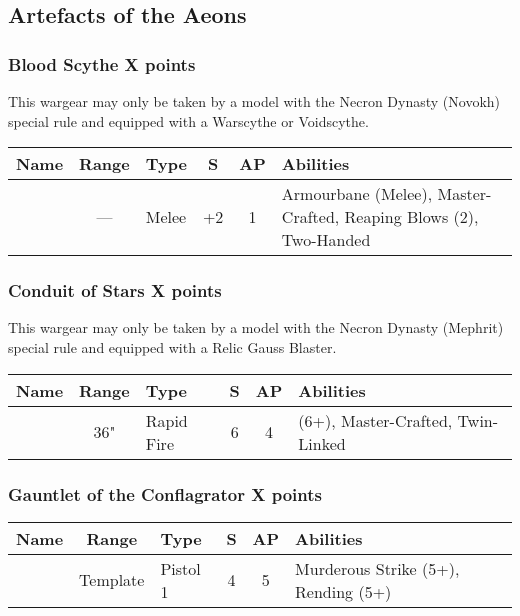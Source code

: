 \newpage
\subsection{Artefacts of the Aeons} \label{Artefacts of the Aeons}

\subsubsection[Blood Scythe]{Blood Scythe \dotfill X points}

This wargear may only be taken by a model with the Necron Dynasty (Novokh) special rule and equipped with a Warscythe or Voidscythe.

\label{Blood Scythe}
\noindent
\begin{NiceTabular}{L{115 pt} c C{40pt} *{2}{c} >{\raggedright\arraybackslash}p{240pt}}
	Name & Range & Type & S & AP & Abilities \\
	\hline
	 & — & Melee & +2 & 1 & Armourbane (Melee), Master-Crafted, Reaping Blows (2), Two-Handed \\
\end{NiceTabular}

\subsubsection[Conduit of Stars]{Conduit of Stars \dotfill X points}
This wargear may only be taken by a model with the Necron Dynasty (Mephrit) special rule and equipped with a Relic Gauss Blaster.

\label{Conduit of Stars}
\noindent
\begin{NiceTabular}{L{115 pt} c C{40pt} *{2}{c} >{\raggedright\arraybackslash}p{240pt}}
	Name & Range & Type & S & AP & Abilities \\
	\hline
	 & 36" & Rapid Fire & 6 & 4 &  (6+), Master-Crafted, Twin-Linked \\	
\end{NiceTabular}


\subsubsection[Gauntlet of the Conflagrator]{Gauntlet of the Conflagrator \dotfill X points}

\label{Gauntlet of the Conflagrator}
\noindent
\begin{NiceTabular}{L{115 pt} c C{40pt} *{2}{c} >{\raggedright\arraybackslash}p{240pt}}
	Name & Range & Type & S & AP & Abilities \\
	\hline
	 & Template & Pistol 1 & 4 & 5 & Murderous Strike (5+), Rending (5+) \\	
\end{NiceTabular}

